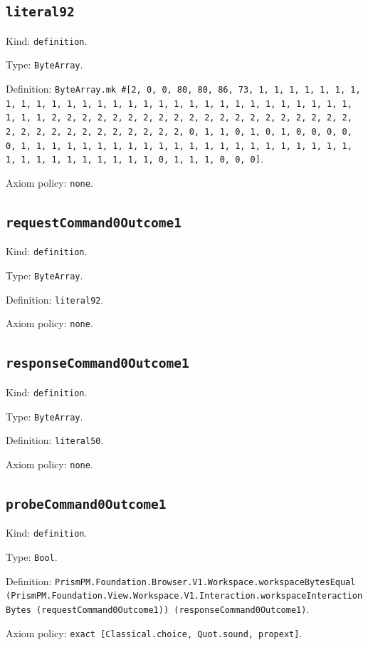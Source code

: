 \documentclass[11pt]{article}
\begin{document}
\subsection*{\texttt{literal92}}
\noindent Kind: \texttt{definition}.\par
\noindent Type: \texttt{ByteArray}.\par
\noindent Definition: \texttt{ByteArray.mk \#[2, 0, 0, 80, 80, 86, 73, 1, 1, 1, 1, 1, 1, 1, 1, 1, 1, 1, 1, 1, 1, 1, 1, 1, 1, 1, 1, 1, 1, 1, 1, 1, 1, 1, 1, 1, 1, 1, 1, 1, 2, 2, 2, 2, 2, 2, 2, 2, 2, 2, 2, 2, 2, 2, 2, 2, 2, 2, 2, 2, 2, 2, 2, 2, 2, 2, 2, 2, 2, 2, 2, 2, 0, 1, 1, 0, 1, 0, 1, 0, 0, 0, 0, 0, 1, 1, 1, 1, 1, 1, 1, 1, 1, 1, 1, 1, 1, 1, 1, 1, 1, 1, 1, 1, 1, 1, 1, 1, 1, 1, 1, 1, 1, 1, 1, 1, 0, 1, 1, 1, 0, 0, 0]}.\par
\noindent Axiom policy: \texttt{none}.\par
\subsection*{\texttt{requestCommand0Outcome1}}
\noindent Kind: \texttt{definition}.\par
\noindent Type: \texttt{ByteArray}.\par
\noindent Definition: \texttt{literal92}.\par
\noindent Axiom policy: \texttt{none}.\par
\subsection*{\texttt{responseCommand0Outcome1}}
\noindent Kind: \texttt{definition}.\par
\noindent Type: \texttt{ByteArray}.\par
\noindent Definition: \texttt{literal50}.\par
\noindent Axiom policy: \texttt{none}.\par
\subsection*{\texttt{probeCommand0Outcome1}}
\noindent Kind: \texttt{definition}.\par
\noindent Type: \texttt{Bool}.\par
\noindent Definition: \texttt{PrismPM.Foundation.Browser.V1.Workspace.workspaceBytesEqual (PrismPM.Foundation.View.Workspace.V1.Interaction.workspaceInteractionBytes (requestCommand0Outcome1)) (responseCommand0Outcome1)}.\par
\noindent Axiom policy: \texttt{exact [Classical.choice, Quot.sound, propext]}.\par
\end{document}
